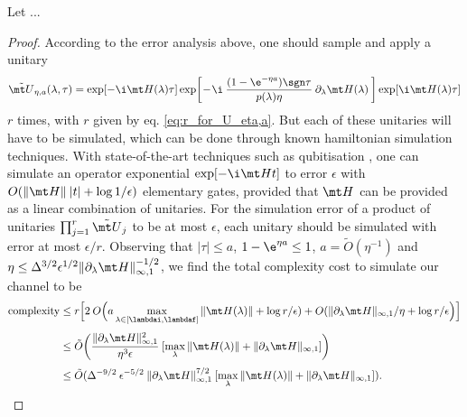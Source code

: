 \begin{theorem}
Let ...
\end{theorem}

\begin{proof}
According to the error analysis above, one should sample and apply a unitary
\begin{align}
    \tilde{\mt U}_{\eta, a}(\lambda, \tau) = \exp[-\i \mt H(\lambda) \tau] \exp \! \bigg[ \!-\!\i \> \frac{(1 - \e^{-\eta a})\sgn\tau}{p(\lambda)\eta} \> \partial_\lambda \mt H(\lambda)\> \bigg] \exp[\i \mt H(\lambda)\tau]
\end{align}
$r$ times, with $r$ given by eq. \ref{eq:r_for_U_eta,a}. But each of these unitaries will have to be simulated, which can be done through known hamiltonian simulation techniques. With state-of-the-art techniques such as qubitisation \cite{}, one can simulate an operator exponential $\exp[-\i \mt H t]$ to error $\epsilon$ with $O(\|\mt H\| \> |t| + \log 1 / \epsilon)$ elementary gates, provided that $\mt H$ can be provided as a linear combination of unitaries. For the simulation error of a product of unitaries $\prod_{j=1}^r \tilde{\mt U}_j$ to be at most $\epsilon$, each unitary should be simulated with error at most $\epsilon / r$. Observing that $|\tau| \leq a$, $1 - \e^{\eta a} \leq 1$, $a = \tilde O(\eta^{-1})$ and $\eta \leq \Delta^{3/2}\epsilon^{1/2}\|\partial_\lambda \mt H\|_{\infty, 1}^{-1/2}$, we find the total complexity cost to simulate our channel to be
\begin{align}
    \text{complexity} &\leq r\Big[ 2 \> O\Big( a \max_{\lambda \in [\lambdai, \lambdaf]} \|\mt H(\lambda)\| + \log r / \epsilon) + O(\|\partial_\lambda \mt H\|_{\infty, 1} / \eta + \log r / \epsilon \Big) \Big] \nonumber \\[1mm]
    &\leq \tilde O \bigg( \frac{\|\partial_\lambda \mt H\|_{\infty, 1}^2}{\eta^3 \epsilon} \> [\max_\lambda \|\mt H(\lambda)\| + \|\partial_\lambda \mt H\|_{\infty, 1}] \bigg) \nonumber \\[1mm]
    &\leq \tilde O(\Delta^{-9/2} \> \epsilon^{-5/2} \> \|\partial_\lambda \mt H\|_{\infty, 1}^{7/2} \> [\max_\lambda \|\mt H(\lambda)\| + \|\partial_\lambda \mt H\|_{\infty, 1}] ).
\end{align}
\end{proof}
